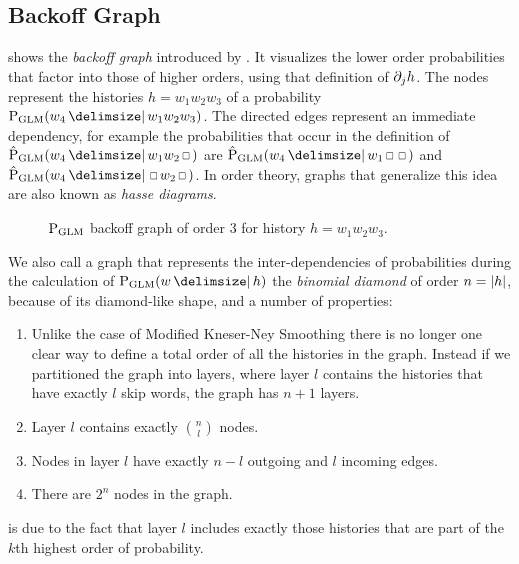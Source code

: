 \subsection{Backoff Graph}
\label{subsec:backoff-graph}

 shows the \emph{backoff graph} introduced by
\textcite{BilmesKirchhoff2003}.
It visualizes the lower order probabilities that factor into those of higher
orders, using that definition of $\SkpOp[j]{h}$.
The nodes represent the histories $h = w_1 w_2 w_3$ of a probability
$\ProbGLM{w_4}{w_1 w_2 w_3}$.
The directed edges represent an immediate dependency, for example the
probabilities that occur in the definition of
$\ProbGLM*{w_4}{w_1 w_2 \Skp}$ are $\ProbGLM*{w_4}{w_1 \Skp \Skp}$ and
$\ProbGLM*{w_4}{\Skp w_2 \Skp}$.
In order theory, graphs that generalize this idea are also known as
\emph{hasse diagrams}.

\begin{figure}
  \centering
  
  \caption{
    $\ProbGLM$ backoff graph of order 3 for history $h = w_1 w_2 w_3$.
  }
  \label{fig:history-glm}
\end{figure}


We also call a graph that represents the inter-dependencies of probabilities
during the calculation of $\ProbGLM{w}{h}$ the \emph{binomial diamond} of order
$n = {\left|h\right|}$, because of its diamond-like shape, and a number of
properties:

\begin{enumerate}
  \item \label{itm:num-layers} Unlike the case of Modified Kneser-Ney Smoothing
    there is no longer one clear way to define a total order of all the
    histories in the graph.
    Instead if we partitioned the graph into layers, where layer $l$ contains
    the histories that have exactly $l$ skip words, the graph has $n + 1$ layers.
  \item \label{itm:num-childs} Layer $l$ contains exactly $\binom{n}{l}$ nodes.
  \item \label{itm:num-edges}  Nodes in layer $l$ have exactly $n - l$ outgoing
    and $l$ incoming edges.
  \item \label{itm:num-nodes}  There are $2^n$ nodes in the graph.
\end{enumerate}

 is due to the fact that layer $l$ includes exactly those
histories that are part of the $k$th highest order of probability.


